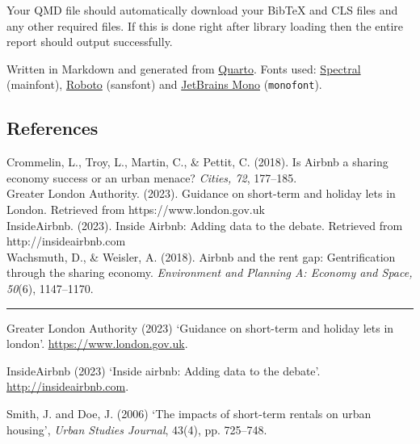 \documentclass[
  a4paper,
  DIV=11,
  numbers=noendperiod]{scrartcl}
\newlength{\cslhangindent}
\newenvironment{CSLReferences}[2] %
 {\begin{list}{}{%
  \setlength{\itemindent}{0pt}
  \setlength{\leftmargin}{0pt}
  \setlength{\parsep}{0pt}
  \ifodd #1
   \setlength{\leftmargin}{\cslhangindent}
   \setlength{\itemindent}{-1\cslhangindent}
  \fi
  \setlength{\itemsep}{#2\baselineskip}}}
 {\end{list}}
\begin{document}
Your QMD file should automatically download your BibTeX and CLS files
and any other required files. If this is done right after library
loading then the entire report should output successfully.

Written in Markdown and generated from
\href{https://quarto.org/}{Quarto}. Fonts used:
\href{https://fonts.google.com/specimen/Spectral}{Spectral} (mainfont),
\href{https://fonts.google.com/specimen/Roboto}{Roboto} ({sansfont}) and
\href{https://fonts.google.com/specimen/JetBrains\%20Mono}{JetBrains
Mono} (\texttt{monofont}).

\subsection{References}\label{references}

Crommelin, L., Troy, L., Martin, C., \& Pettit, C. (2018). Is Airbnb a
sharing economy success or an urban menace? \emph{Cities, 72},
177--185.\\
Greater London Authority. (2023). Guidance on short-term and holiday
lets in London. Retrieved from https://www.london.gov.uk\\
InsideAirbnb. (2023). Inside Airbnb: Adding data to the debate.
Retrieved from http://insideairbnb.com\\
Wachsmuth, D., \& Weisler, A. (2018). Airbnb and the rent gap:
Gentrification through the sharing economy. \emph{Environment and
Planning A: Economy and Space, 50}(6), 1147--1170.

\begin{center}\rule{0.5\linewidth}{0.5pt}\end{center}

\label{refs}
\begin{CSLReferences}{0}{1}
Greater London Authority (2023) {`Guidance on short-term and holiday
lets in london'}. \url{https://www.london.gov.uk}.

InsideAirbnb (2023) {`Inside airbnb: Adding data to the debate'}.
\url{http://insideairbnb.com}.

Smith, J. and Doe, J. (2006) {`The impacts of short-term rentals on
urban housing'}, \emph{Urban Studies Journal}, 43(4), pp. 725--748.

\end{CSLReferences}
\end{document}
